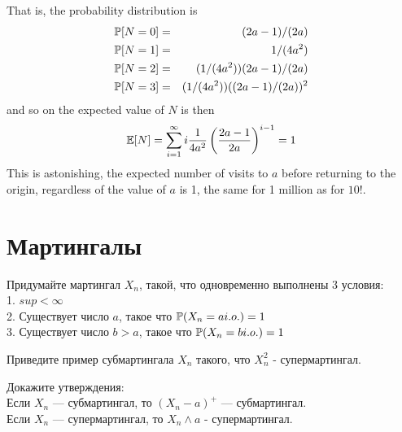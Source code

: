 \begin{solution}
That is, the probability distribution is 
\begin{eqnarray*}
  \P[N = 0] &=& (2a-1)/(2a) \\
  \P[N = 1] &=& 1/(4a^2) \\
  \P[N = 2] &=& ( 1/(4 a^2)) (2a-1)/(2a) \\
  \P[N = 3] &=& ( 1/(4 a^2)) ((2a-1)/(2a))^2 \\ 
\end{eqnarray*}
and so on the expected value of $N$ is then
\[
    \E[N] = \sum_{i=1}^{\infty} i \frac{1}{4a^2} \left(
    \frac{2a-1}{2a} \right)^{i-1} = 1
\]
This is astonishing, the expected number of visits to $a$
before returning to the origin, regardless of the value of $a$
is 1, the same for 1 million as for $10$!.
\end{solution}



\section{Мартингалы} 

\begin{problem}
Придумайте мартингал $X_{n}$, такой, что одновременно выполнены 3 условия: \\
1. $sup <\infty$ \\
2. Существует число $a$, такое что $\P(X_{n}=a i.o.)=1$ \\
3. Существует число $b>a$, такое что $\P(X_{n}=b i.o.)=1$ 
\end{problem} 
\begin{solution} 

\end{solution}

\begin{problem}
Приведите пример субмартингала $X_{n}$ такого, что $X_{n}^{2}$ -
супермартингал. 
\end{problem} 
\begin{solution} 

\end{solution}

\begin{problem}
Докажите утверждения: \\
Если $X_{n}$ --- субмартингал, то $(X_{n}-a)^{+}$ --- субмартингал. \\
Если $X_{n}$ --- супермартингал, то $X_{n} \wedge a$ -
супермартингал. 
\end{problem} 
\begin{solution} 

\end{solution}


